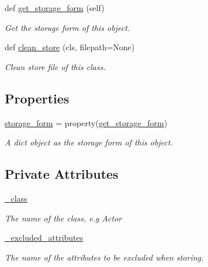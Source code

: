 \begin{DoxyCompactItemize}
def \hyperlink{classsylva_1_1base_1_1sylva__base_1_1_s_y_l_v_a_base_a8d94af12d912b69a5c8ada74debce019}{get\+\_\+storage\+\_\+form} (self)
\begin{DoxyCompactList}\small\item\em Get the storage form of this object. \end{DoxyCompactList}\item 
def \hyperlink{classsylva_1_1base_1_1sylva__base_1_1_s_y_l_v_a_base_a4b28a6df0e18ab256c21493b49a64b22}{clean\+\_\+store} (cls, filepath=None)
\begin{DoxyCompactList}\small\item\em Clean store file of this class. \end{DoxyCompactList}\end{DoxyCompactItemize}
\subsection*{Properties}
\begin{DoxyCompactItemize}
\item 
\hyperlink{classsylva_1_1base_1_1sylva__base_1_1_s_y_l_v_a_base_a19a76f0bddbefbe0687234c9da15c8fc}{storage\+\_\+form} = property(\hyperlink{classsylva_1_1base_1_1sylva__base_1_1_s_y_l_v_a_base_a8d94af12d912b69a5c8ada74debce019}{get\+\_\+storage\+\_\+form})
\begin{DoxyCompactList}\small\item\em A dict object as the storage form of this object. \end{DoxyCompactList}\end{DoxyCompactItemize}
\subsection*{Private Attributes}
\begin{DoxyCompactItemize}
\item 
\hyperlink{classsylva_1_1base_1_1sylva__base_1_1_s_y_l_v_a_base_a7225be10455bba307832200d18167bd4}{\+\_\+class}
\begin{DoxyCompactList}\small\item\em The name of the class, e.\+g {\ttfamily Actor} \end{DoxyCompactList}\item 
\hyperlink{classsylva_1_1base_1_1sylva__base_1_1_s_y_l_v_a_base_a756882c2570aaef7562ad5903717328c}{\+\_\+excluded\+\_\+attributes}
\begin{DoxyCompactList}\small\item\em The name of the attributes to be excluded when storing. \end{DoxyCompactList}\end{DoxyCompactItemize}


